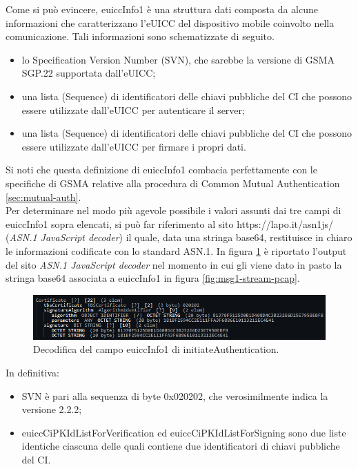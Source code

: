 \documentclass[10pt, oneside]{book}
\begin{document}
\noindent Come si può evincere, euiccInfo1 è una struttura dati composta da alcune informazioni che caratterizzano l'eUICC del dispositivo mobile coinvolto nella comunicazione. Tali informazioni sono schematizzate di seguito.
\begin{itemize}
\item lo Specification Version Number (SVN), che sarebbe la versione di GSMA SGP.22 supportata dall'eUICC;
\item una lista (Sequence) di identificatori delle chiavi pubbliche del CI che possono essere utilizzate dall'eUICC per autenticare il server;
\item una lista (Sequence) di identificatori delle chiavi pubbliche del CI che possono essere utilizzate dall'eUICC per firmare i propri dati.
\end{itemize}
Si noti che questa definizione di euiccInfo1 combacia perfettamente con le specifiche di GSMA \cite{GSMA-docs-new} relative alla procedura di Common Mutual Authentication \ref{sec:mutual-auth}.\\
Per determinare nel modo più agevole possibile i valori assunti dai tre campi di euiccInfo1 sopra elencati, si può far riferimento al sito https://lapo.it/asn1js/ (\textit{ASN.1 JavaScript decoder}) il quale, data una stringa base64, restituisce in chiaro le informazioni codificate con lo standard ASN.1. In figura \ref{fig:decode-euiccInfo1} è riportato l'output del sito \textit{ASN.1 JavaScript decoder} nel momento in cui gli viene dato in pasto la stringa base64 associata a euiccInfo1 in figura \ref{fig:msg1-stream-pcap}.
\begin{figure}
\includegraphics[width=\linewidth]{decode-euiccInfo1.png}
\caption{Decodifica del campo euiccInfo1 di initiateAuthentication.}
\label{fig:decode-euiccInfo1}
\end{figure}
In definitiva:
\begin{itemize}
\item SVN è pari alla sequenza di byte 0x020202, che verosimilmente indica la versione 2.2.2;
\item euiccCiPKIdListForVerification ed euiccCiPKIdListForSigning sono due liste identiche ciascuna delle quali contiene due identificatori di chiavi pubbliche del CI.
\end{itemize}
\end{document}
